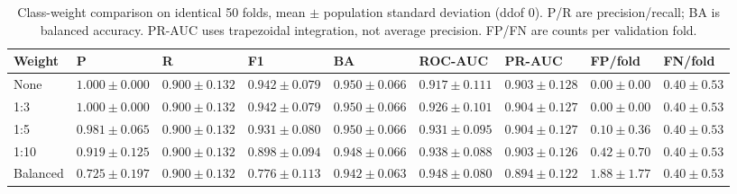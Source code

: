 \begin{table}[t]
\centering
\caption{Class-weight comparison on identical 50 folds, mean $\pm$ population standard deviation (ddof 0). P/R are precision/recall; BA is balanced accuracy. PR-AUC uses trapezoidal integration, not average precision. FP/FN are counts per validation fold.}
\label{tab:weights}
\small
\begin{tabular}{lllllllll}
\toprule
Weight & P & R & F1 & BA & ROC-AUC & PR-AUC & FP/fold & FN/fold \\
\midrule
None & $1.000\pm0.000$ & $0.900\pm0.132$ & $0.942\pm0.079$ & $0.950\pm0.066$ & $0.917\pm0.111$ & $0.903\pm0.128$ & $0.00\pm0.00$ & $0.40\pm0.53$ \\
1:3 & $1.000\pm0.000$ & $0.900\pm0.132$ & $0.942\pm0.079$ & $0.950\pm0.066$ & $0.926\pm0.101$ & $0.904\pm0.127$ & $0.00\pm0.00$ & $0.40\pm0.53$ \\
1:5 & $0.981\pm0.065$ & $0.900\pm0.132$ & $0.931\pm0.080$ & $0.950\pm0.066$ & $0.931\pm0.095$ & $0.904\pm0.127$ & $0.10\pm0.36$ & $0.40\pm0.53$ \\
1:10 & $0.919\pm0.125$ & $0.900\pm0.132$ & $0.898\pm0.094$ & $0.948\pm0.066$ & $0.938\pm0.088$ & $0.903\pm0.126$ & $0.42\pm0.70$ & $0.40\pm0.53$ \\
Balanced & $0.725\pm0.197$ & $0.900\pm0.132$ & $0.776\pm0.113$ & $0.942\pm0.063$ & $0.948\pm0.080$ & $0.894\pm0.122$ & $1.88\pm1.77$ & $0.40\pm0.53$ \\
\bottomrule
\end{tabular}
\end{table}
